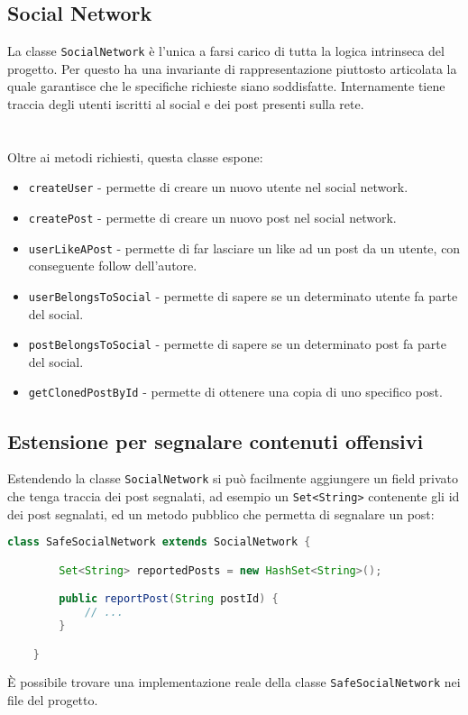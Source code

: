 \documentclass[a4paper,10pt]{book}
\begin{document}
\subsection*{Social Network}
La classe \texttt{SocialNetwork} è l'unica a farsi carico di tutta la logica intrinseca del progetto. Per questo ha una invariante di rappresentazione piuttosto articolata la quale
garantisce che le specifiche richieste siano soddisfatte. Internamente tiene traccia degli utenti iscritti al social e dei post presenti sulla rete.
\\~\\~\\
Oltre ai metodi richiesti, questa classe espone:

\begin{itemize}
    \item \texttt{createUser} - permette di creare un nuovo utente nel social network.
    \item \texttt{createPost} - permette di creare un nuovo post nel social network.
    \item \texttt{userLikeAPost} - permette di far lasciare un like ad un post da un utente, con conseguente follow dell'autore.
    \item \texttt{userBelongsToSocial} - permette di sapere se un determinato utente fa parte del social.
    \item \texttt{postBelongsToSocial} - permette di sapere se un determinato post fa parte del social.
    \item \texttt{getClonedPostById} - permette di ottenere una copia di uno specifico post.
\end{itemize}


\subsection*{Estensione per segnalare contenuti offensivi}
Estendendo la classe \texttt{SocialNetwork} si può facilmente aggiungere un field privato che tenga traccia dei post segnalati,
ad esempio un \texttt{Set<String>} contenente gli id dei post segnalati, ed un metodo pubblico che permetta di segnalare un post:
\begin{lstlisting}[language=java]
    class SafeSocialNetwork extends SocialNetwork {

        Set<String> reportedPosts = new HashSet<String>();

        public reportPost(String postId) {
            // ...
        }

    }
\end{lstlisting}
È possibile trovare una implementazione reale della classe \texttt{SafeSocialNetwork} nei file del progetto.
\end{document}
